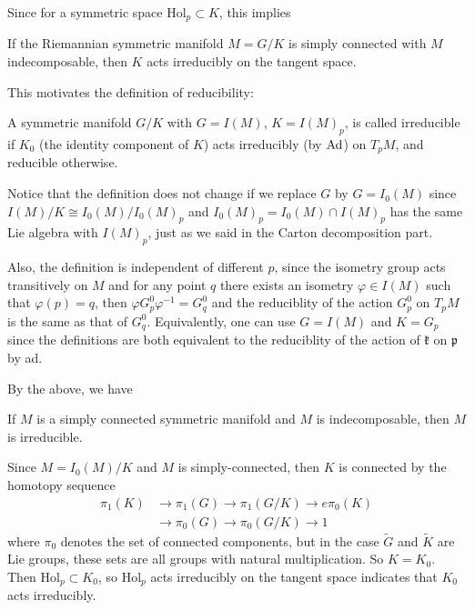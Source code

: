 Since for a symmetric space Hol$_{p} \subset K$, this implies 

\begin{corollary}
	If the Riemannian symmetric manifold $M = G / K$ is simply
	connected with $M$ indecomposable, then $K$ acts irreducibly
	on the tangent space.
\end{corollary}

This motivates the definition of reducibility:

\begin{definition}
	A symmetric manifold $G / K$ with $G = {I}(M)$, $K = I(M)_p$,
	is called irreducible if $K_0$ (the identity component of
	$K$) acts irreducibly (by $\mathrm{Ad}$) on $T_pM$, and reducible
	otherwise.
\end{definition}

Notice that the definition does not change if we replace $G$ by
$G = I_0(M)$ since $I(M)/K\cong I_0(M)/I_0(M)_p$ and $I_0(M)_p =
I_0(M)\cap I(M)_p$ has the same Lie algebra with $I(M)_p$, just
as we said in the Carton decomposition part.

Also, the definition is independent of different  $p$, since the
isometry
group acts transitively on $M$ and for any point $q$ there exists
an isometry $\varphi \in I(M)$ such that $\varphi(p) = q$, then
$\varphi G_{p}^{0} \varphi^{-1} = G_{q}^{0}$ and the reduciblity
of the action $G_{p}^{0}$ on $T_{p} M$ is the same as that of
$G_{q}^{0}$. Equivalently, one can use $G = I(M)$ and $K = G_{p}
$ since the definitions are
both equivalent to the reduciblity of the action of
$\mathfrak{k}$ on $\mathfrak{p}$ by ad.


By the above, we have
\begin{theorem}
	If $M$ is a simply connected symmetric manifold and $M$ is
	indecomposable, then $M$ is irreducible.
\end{theorem}
\bproof
Since $M = I_{0}(M) / K$ and $M$ is simply-connected, then $K$ is
connected by the homotopy sequence
\[
\begin{aligned}
	\pi_{1}(K) & \rightarrow \pi_{1}(G) \rightarrow \pi_{1}(G /
	K) \rightarrow e \pi_{0}(K) \\
	& \rightarrow \pi_{0}(G) \rightarrow \pi_{0}(G / K) \rightarrow 1
\end{aligned}
\]
where $\pi_{0}$ denotes the set of connected components, but in the case $\tilde{G}$ and
$\tilde{K}$ are Lie groups, these sets are all groups with natural multiplication. So $K = K_{0} .$ Then $\mathrm{Hol}_{p} \subset K_{0}$, so $\mathrm{Hol}_{p}$ acts irreducibly on the tangent space indicates that $K_{0}$ acts irreducibly.
\eproof

